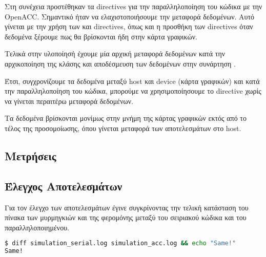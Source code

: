 \documentclass[11pt]{scrartcl} %
\begin{document}
Στη συνέχεια προστέθηκαν τα directives για την παραλληλοποίηση του κώδικα με την OpenACC.
Σημαντικό ήταν να ελαχιστοποιήσουμε την μεταφορά δεδομένων. Αυτό γίνεται με την χρήση των  και  directives,
όπως και η προσθήκη των  directives όταν δεδομένα ξέρουμε πως θα βρίσκονται ήδη στην κάρτα γραφικών.

Τελικά στην υλοποίησή έχουμε μία αρχική μεταφορά δεδομένων 
κατά την αρχικοποίηση της κλάσης  και αποδέσμευση των δεδομένων στην συνάρτηση .





Έτσι, συγχρονίζουμε τα δεδομένα μεταξύ host και device (κάρτα γραφικών) και κατά την παραλληλοποίηση του κώδικα, 
μπορούμε να χρησιμοποίησουμε το  directive χωρίς να γίνεται περαιτέρω μεταφορά δεδομένων.

Τα δεδομένα βρίσκονται μονίμως στην μνήμη της κάρτας γραφικών εκτός από το τέλος της προσομοίωσης, όπου γίνεται μεταφορά των αποτελεσμάτων στο host.

\subsection{Μετρήσεις}
\subsection{Έλεγχος Αποτελεσμάτων}

Για τον έλεγχο των αποτελεσμάτων έγινε συγκρίνοντας 
την τελική κατάσταση του πίνακα των μυρμηγκιών και της φερομόνης 
μεταξύ του σειριακού κώδικα και του παραλληλοποιημένου.

\begin{lstlisting}[language=Bash]
$ diff simulation_serial.log simulation_acc.log && echo "Same!"
Same!
\end{lstlisting}

% 
\end{document}
